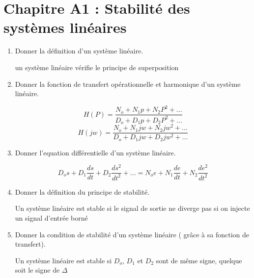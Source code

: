\section*{\centering Chapitre A1 : Stabilité des systèmes linéaires}
\begin{enumerate}[label=\arabic{enumi} - , left=0pt, itemsep=1em] %
    \item Donner la définition d'un système linéaire. \par
    \begin{solution}
          un système linéaire vérifie le principe de superposition
    \end{solution}

    \item Donner la fonction de transfert opérationnelle et harmonique d'un système linéaire. \par
    \begin{solution}
          \[ H(P) = \frac{N_o + N_1p + N_2P^2 + ... }{D_o + D_1p + D_2P^2 + ... }\]
          \[ H(jw) = \frac{N_o + N_1jw + N_2jw^2 + ... }{D_o + D_1jw + D_2jw^2 + ... }\]
    \end{solution}

    \item Donner l'equation différentielle d'un système linéaire. \par
    \begin{solution}
          \[ D_os+D_1 \frac{ds}{dt} + D_2 \frac{ds^2}{dt^2} + ... = N_oe + N_1\frac{de}{dt} + N_2\frac{de^2}{dt^2}\]
    \end{solution}

    \item Donner la définition du principe de stabilité. \par
    \begin{solution}
        Un système linéaire est stable si le signal de sortie ne diverge pas si on injecte un signal d'entrée borné
    \end{solution}

    \item Donner la condition de stabilité d'un système linéaire ( grâce à sa fonction de transfert). \par
    \begin{solution}
        Un système linéaire est stable si $D_o$, $D_1$ et $D_2$ sont de même signe, quelque soit le signe de  $\Delta$
    \end{solution}
\end{enumerate}